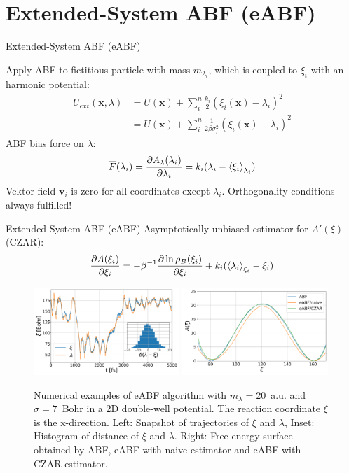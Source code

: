 \documentclass[10pt]{beamer}
\begin{document}
\section{Extended-System ABF (eABF)}
\begin{frame}{Extended-System ABF (eABF)}

Apply ABF to fictitious particle with mass $m_{\lambda_i}$, which is coupled to $\xi_i$ with an harmonic potential:
\begin{equation}
  \begin{split}
  U_{ext}(\textbf{x},\lambda) &= U(\textbf{x}) + \sum_i^n \frac{k_i}{2}(\xi_{i}(\textbf{x})-\lambda_i)^2\\
  &= U(\textbf{x}) + \sum_i^n \frac{1}{2\beta\sigma_i^2}(\xi_{i}(\textbf{x})-\lambda_i)^2
\end{split}
\end{equation}
ABF bias force on $\lambda$:
\begin{equation}
  \overline{F}(\lambda_{i}) = \frac{\partial A_\lambda(\lambda_{i})}{\partial \lambda_i}=k_i(\lambda_i-\braket{\xi_{i}}_{\lambda_i})
\end{equation}
Vektor field $\textbf{v}_i$ is zero for all coordinates except $\lambda_i$. Orthogonality conditions always fulfilled!
\end{frame}

\begin{frame}{Extended-System ABF (eABF)}
Asymptotically unbiased estimator for $A'(\xi)$ (CZAR):
 \begin{equation}
   \frac{\partial A(\xi_i)}{\partial \xi_i} = -\beta^{-1}\frac{\partial \ln \rho_B(\xi_i)}{\partial \xi_i} + k_i(\braket{\lambda_i}_{\xi_i}-\xi_{i})
 \end{equation}
  \begin{figure}[H]
      \centering
      \includegraphics[width=0.49\textwidth]{bilder/eABF_traj}
      \includegraphics[width=0.49\textwidth]{bilder/eABF_freeE}
      \caption{Numerical examples of eABF algorithm with $m_\lambda=20$~a.u. and $\sigma=7$~Bohr in a 2D double-well potential. The reaction coordinate $\xi$ is the x-direction. Left: Snapshot of trajectories of $\xi$ and $\lambda$, Inset: Histogram of distance of $\xi$ and $\lambda$. Right: Free energy surface obtained by ABF, eABF with naive estimator and eABF with CZAR estimator.}
  \end{figure}
\end{frame}
\end{document}

